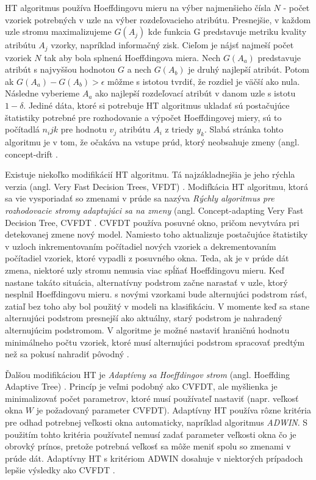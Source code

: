 HT algoritmus používa Hoeffdingovu mieru na výber najmenšieho čísla $N$ - počet vzoriek potrebných v uzle na výber rozdeľovacieho atribútu. Presnejšie, v každom uzle stromu maximalizujeme $G(A_j)$ kde funkcia G predstavuje metriku kvality atribútu $A_j$ vzorky, napríklad informačný zisk. Cieľom je nájsť najmeší počet vzoriek $N$ tak aby bola splnená Hoeffdingova miera. Nech $G(A_a)$ predstavuje atribút s najvyššou hodnotou $G$ a nech $G(A_b)$ je druhý najlepší atribút. Potom ak $G(A_a) - G(A_b) > \epsilon$ môžme s istotou tvrdiť, že rozdiel je väčší ako nula. Následne vyberieme $A_a$ ako najlepší rozdeľovací atribút v danom uzle s istotu $1-\delta$. Jediné dáta, ktoré si potrebuje HT algoritmus ukladať sú postačujúce štatistiky potrebné pre rozhodovanie a výpočet Hoeffdingovej miery, sú to počítadlá $n_ijk$ pre hodnotu $v_j$ atribútu $A_i$ z triedy $y_k$. Slabá stránka tohto algoritmu je v tom, že očakáva na vstupe prúd, ktorý neobsahuje zmeny (angl. concept-drift \citep{domingos2000mining}.
\par %
Existuje niekoľko modifikácií HT algoritmu. Tá najzákladnejšia je jeho rýchla verzia (angl. Very Fast Decision Trees, VFDT) \citep{domingos2000mining}. Modifkácia HT algoritmu, ktorá sa vie vysporiadať so zmenami v prúde sa nazýva \textit{Rýchly algoritmus pre rozhodovacie stromy adaptujúci sa na zmeny} (angl. Concept-adapting Very Fast Decision Tree, CVFDT \citep{hulten2001mining}. CVFDT používa posuvné okno, pričom nevytvára pri detekovanej zmene nový model. Namiesto toho aktualizuje postačujúce štatistiky v uzloch inkrementovaním počítadiel nových vzoriek a dekrementovaním počítadiel vzoriek, ktoré vypadli z posuvného okna. Teda, ak je v prúde dát zmena, niektoré uzly stromu nemusia viac spĺňať Hoeffdingovu mieru. Keď nastane takáto situácia, alternatívny podstrom začne narastať v uzle, ktorý nesplnil Hoeffdingovu mieru. s novými vzorkami bude alternujúci podstrom rásť, zatiaľ bez toho aby bol použitý v modeli na klasifikáciu. V momente keď sa stane alternujúci podstrom presnejší ako aktuálny, starý podstrom je nahradený alternujúcim podstromom. V algoritme je možné nastaviť hraničnú hodnotu minimálneho počtu vzoriek, ktoré musí alternujúci podstrom spracovať predtým než sa pokusí nahradiť pôvodný \citep{hulten2001mining}.
\par
Ďalšou modifikáciou HT je \textit{Adaptívny sa Hoeffdingov strom} (angl. Hoeffding Adaptive Tree) \citep{bifet2009adaptive}. Princíp je veľmi podobný ako CVFDT, ale myšlienka je minimalizovať počet parametrov, ktoré musí používateľ nastaviť (napr. veľkosť okna $W$ je požadovaný parameter CVFDT). Adaptívny HT používa rôzne 	kritéria pre odhad potrebnej veľkosti okna automaticky, napríklad algoritmus \textit{ADWIN}. S použitím tohto kritéria používateľ nemusí zadať parameter veľkosti okna čo je obrovký prínos, pretože potrebná veľkosť sa môže meniť spolu so zmenami v prúde dát. Adaptívny HT s kritériom ADWIN dosahuje v niektorých prípadoch lepšie výsledky ako CVFDT \citep{bifet2009adaptive}.
